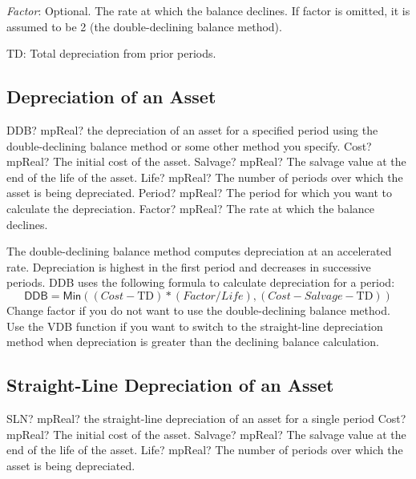 \textit{Factor}: Optional. The rate at which the balance declines. If factor is omitted, it is assumed to be 2 (the double-declining balance method).

TD: Total depreciation from prior periods.



\subsection{Depreciation of an Asset}


\begin{mpFunctionsExtract}
	\mpWorksheetFunctionFiveNotImplemented
	{DDB? mpReal? the depreciation of an asset for a specified period using the double-declining balance method or some other method you specify.}
	{Cost? mpReal?  The initial cost of the asset.}
	{Salvage? mpReal? The salvage value at the end of the life of the asset.}
	{Life? mpReal? The number of periods over which the asset is being depreciated.}
	{Period? mpReal? The period for which you want to calculate the depreciation.}
	{Factor? mpReal? The rate at which the balance declines.}
\end{mpFunctionsExtract}


\vspace{0.3cm}
The double-declining balance method computes depreciation at an accelerated rate. Depreciation is highest in the first period and decreases in successive periods. DDB uses the following formula to calculate depreciation for a period: 
\begin{equation}
	\textsf{DDB} = \textsf{Min}\left((\textit{Cost} - \text{TD}) * (\textit{Factor}/\textit{Life}), (\textit{Cost}-\textit{Salvage}-\text{TD})\right)
\end{equation}
Change factor if you do not want to use the double-declining balance method.
Use the \textsf{VDB} function if you want to switch to the straight-line depreciation method when depreciation is greater than the declining balance calculation.



\subsection{Straight-Line Depreciation of an Asset}

\begin{mpFunctionsExtract}
	\mpWorksheetFunctionThreeNotImplemented
	{SLN? mpReal? the straight-line depreciation of an asset for a single period}
	{Cost? mpReal?  The initial cost of the asset.}
	{Salvage? mpReal? The salvage value at the end of the life of the asset.}
	{Life? mpReal? The number of periods over which the asset is being depreciated.}
\end{mpFunctionsExtract}

